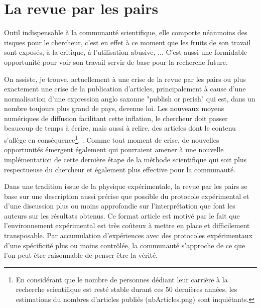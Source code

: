 \section{\nmu La revue par les pairs} \label{sec:pairs}

Outil indispensable à la communauté scientifique, elle comporte néanmoins des risques pour le chercheur, c'est en effet à ce moment que les fruits de son travail sont exposés, à la critique, à l'utilisation abusive, ... C'est aussi une formidable opportunité pour voir son travail servir de base pour la recherche future.

On assiste, je trouve, actuellement à une \og crise \fg de la revue par les pairs ou plus exactement une crise de la publication d'articles, principalement à cause d'une normalisation d'une expression anglo saxonne "publish or perish" qui est, dans un nombre toujours plus grand de pays, devenue loi. Les nouveaux moyens numériques de diffusion facilitant cette inflation, le chercheur doit passer beaucoup de temps à écrire, mais aussi à relire, des articles dont le contenu s'allège en conséquence\footnote{En considérant que le nombre de personnes dédiant leur carrière à la recherche scientifique est resté stable durant ces 50 dernières années, les estimations du nombres d'articles publiés (nbArticles.png) sont inquiétants.}. . Comme tout moment de crise, de nouvelles opportunités émergent également qui pourraient amener à une nouvelle implémentation de cette dernière étape de la méthode scientifique qui soit plus respectueuse du chercheur et également plus effective pour la communauté. 

Dans une tradition issue de la physique expérimentale, la revue par les pairs se base sur une description aussi précise que possible du protocole expérimental et d'une discussion plus ou moins approfondie sur l'interprétation que font les auteurs sur les résultats obtenus. Ce format \og article \fg est motivé par le fait que l'environnement expérimental est très coûteux à mettre en place et difficilement transposable. Par accumulation d'expériences avec des protocoles expérimentaux d'une spécificité plus ou moins contrôlée, la communauté s'approche de ce que l'on peut être raisonnable de penser être la vérité.

